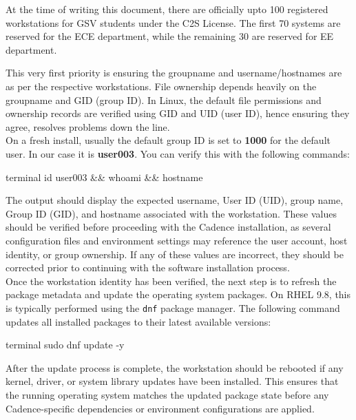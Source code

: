 \begin{tcolorbox}
At the time of writing this document, there are officially upto 100 registered workstations for GSV students under the C2S License. The first 70 systems are reserved for the ECE department, while the remaining 30 are reserved for EE department.
\end{tcolorbox}

This very first priority is ensuring the groupname and username/hostnames are as per the respective workstations. File ownership depends heavily on the groupname and GID (group ID). In Linux, the default file permissions and ownership records are verified using GID and UID (user ID), hence ensuring they agree, resolves problems down the line.\\

On a fresh install, usually the default group ID is set to \textbf{1000} for the default user. In our case it is \textbf{user003}. You can verify this with the following commands:

\begin{codeblock}{terminal}
id user003  && whoami && hostname
\end{codeblock}


The output should display the expected username, User ID (UID), group name, Group ID (GID), and hostname associated with the workstation. These values should be verified before proceeding with the Cadence installation, as several configuration files and environment settings may reference the user account, host identity, or group ownership. If any of these values are incorrect, they should be corrected prior to continuing with the software installation process.\\

\noindent Once the workstation identity has been verified, the next step is to refresh the package metadata and update the operating system packages. On RHEL 9.8, this is typically performed using the \texttt{dnf} package manager. The following command updates all installed packages to their latest available versions:

\begin{codeblock}{terminal}
sudo dnf update -y
\end{codeblock}

After the update process is complete, the workstation should be rebooted if any kernel, driver, or system library updates have been installed. This ensures that the running operating system matches the updated package state before any Cadence-specific dependencies or environment configurations are applied. \\

